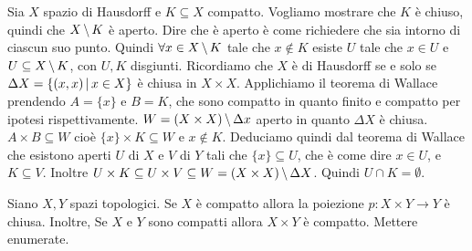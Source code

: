 \documentclass[a4paper]{article}
\begin{document}
\begin{snippetproof}{}
    Sia \(X\) spazio di Hausdorff e \(K \subseteq X\) compatto.
    Vogliamo mostrare che \(K\) è chiuso, quindi che \(X \,\backslash\, K\) è aperto.
    Dire che è aperto è come richiedere che sia intorno di ciascun suo punto.
    Quindi \(\forall x \in X \,\backslash\, K\) tale che \(x\notin K\)
    esiste \(U\) tale che \(x\in U\) e \(U \subseteq X \,\backslash\, K\), con \(U, K\) disgiunti.
    Ricordiamo che \(X\) è di Hausdorff se e solo se
    \(\Delta X = \{(x,x) \,|\, x\in X\}\) è chiusa in \(X \times X\).
    Applichiamo il teorema di Wallace prendendo \(A = \{x\}\)
    e \(B = K\), che sono compatto in quanto finito e compatto per ipotesi rispettivamente.
    \(W = (X \times X) \,\backslash\, \Delta x\)
    aperto in quanto \(\Delta X\) è chiusa.
    \(A \times B \subseteq W\) cioè \(\{x\} \times K \subseteq W\) e \(x \notin K\).
    Deduciamo quindi dal teorema di Wallace che esistono aperti
    \(U\) di \(X\) e \(V\) di \(Y\) tali che
    \(\{x\} \subseteq U\), che è come dire \(x \in U\),
    e \(K \subseteq V\).
    Inoltre \(U \times K \subseteq U \times V \subseteq W = (X \times X) \,\backslash\, \Delta X\).
    Quindi \(U \cap K = \emptyset\).
\end{snippetproof}

\begin{snippetcorollary}{}
    Siano \(X, Y\) spazi topologici.
    Se \(X\) è compatto allora la poiezione \(p \colon X \times Y \to Y\)
    è chiusa. Inoltre, Se \(X\) e \(Y\) sono compatti allora \(X \times Y\) è compatto.
    Mettere enumerate.
\end{snippetcorollary}
\end{document}
